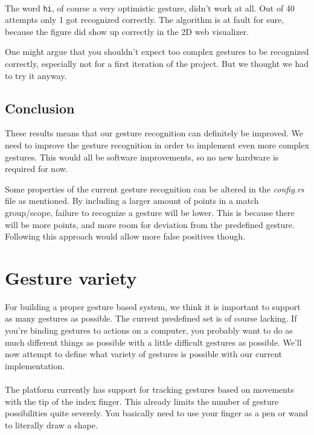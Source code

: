 \documentclass[a4paper]{article}
\begin{document}
  \paragraph{}
  The word \verb_hi_, of course a very optimistic gesture, didn't work at all.
  Out of 40 attempts only 1 got recognized correctly. The algorithm is at fault
  for sure, because the figure did show up correctly in the 2D web visualizer.

  One might argue that you shouldn't expect too complex gestures to be
  recognized correctly, especially not for a first iteration of the project. But
  we thought we had to try it anyway.

  \subsection{Conclusion}
  These results means that our gesture recognition can definitely be improved.
  We need to improve the gesture recognition in order to implement even more
  complex gestures. This would all be software improvements, so no new hardware
  is required for now.

  Some properties of the current gesture recognition can be altered in the
  \textit{config.rs} file as mentioned. By including a larger amount of points
  in a match group/scope, failure to recognize a gesture will be lower.
  This is because there will be more points, and more room for deviation from
  the predefined gesture. Following this approach would allow more false positives though.

  \clearpage

  \section{Gesture variety}
  For building a proper gesture based system, we think it is important to
  support as many gestures as possible. The current predefined set is of course
  lacking. If you're binding gestures to actions on
  a computer, you probably want to do as much different things as possible with
  a little difficult gestures as possible. We'll now attempt to define what
  variety of gestures is possible with our current implementation.

  \paragraph{}
  The platform currently has support for tracking gestures based on movements
  with the tip of the index finger. This already limits the number of gesture
  possibilities quite severely. You basically need to use your finger as a pen
  or wand to literally draw a shape.
\end{document}
